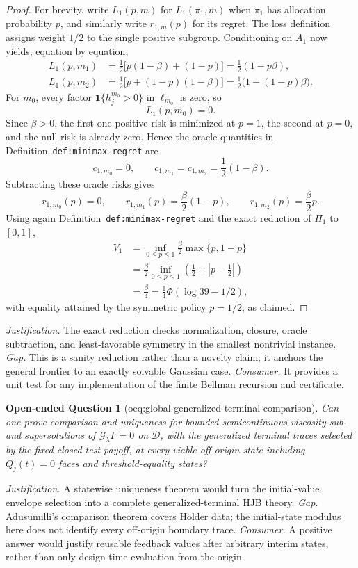 \documentclass{article}
\newtheorem{openendedquestion}{Open-ended Question}
\begin{document}
\begin{proof}
For brevity, write \(L_1(p,m)\) for \(L_1(\pi_1,m)\) when \(\pi_1\) has allocation probability \(p\), and similarly write \(r_{1,m}(p)\) for its regret.  The loss definition assigns weight \(1/2\) to the single positive subgroup.  Conditioning on \(A_1\) now yields, equation by equation,
\[
\begin{aligned}
 L_1(p,m_1)
 &=\frac12\bigl[p(1-\beta)+(1-p)\bigr]
 =\frac12(1-p\beta),\\
 L_1(p,m_2)
 &=\frac12\bigl[p+(1-p)(1-\beta)\bigr]
 =\frac12\bigl(1-(1-p)\beta\bigr).
\end{aligned}
\]
For \(m_0\), every factor \(\mathbf 1\{h_j^{m_0}>0\}\) in \(\ell_{m_0}\) is zero, so
\[
 L_1(p,m_0)=0.
\]
Since \(\beta>0\), the first one-positive risk is minimized at \(p=1\), the second at \(p=0\), and the null risk is already zero.  Hence the oracle quantities in Definition~\texttt{def:minimax-regret} are
\[
 c_{1,m_0}=0,
 \qquad
 c_{1,m_1}=c_{1,m_2}=\frac12(1-\beta).
\]
Subtracting these oracle risks gives
\[
 r_{1,m_0}(p)=0,
 \qquad
 r_{1,m_1}(p)=\frac{\beta}{2}(1-p),
 \qquad
 r_{1,m_2}(p)=\frac{\beta}{2}p.
\]
Using again Definition~\texttt{def:minimax-regret} and the exact reduction of \(\Pi_1\) to \([0,1]\),
\[
\begin{aligned}
 V_1
 &=\inf_{0\leq p\leq1}\frac{\beta}{2}\max\{p,1-p\}\\
 &=\frac{\beta}{2}\inf_{0\leq p\leq1}
 \left(\frac12+\left|p-\frac12\right|\right)\\
 &=\frac{\beta}{4}
 =\frac14\overline\Phi(\log 39-1/2),
\end{aligned}
\]
with equality attained by the symmetric policy \(p=1/2\), as claimed.
\end{proof}
\par\smallskip\noindent \textit{Justification.} The exact reduction checks normalization, closure, oracle subtraction, and least-favorable symmetry in the smallest nontrivial instance. \textit{Gap.} This is a sanity reduction rather than a novelty claim; it anchors the general frontier to an exactly solvable Gaussian case. \textit{Consumer.} It provides a unit test for any implementation of the finite Bellman recursion and certificate.

\begin{openendedquestion}[oeq:global-generalized-terminal-comparison]\label{oeq:global-generalized-terminal-comparison}
Can one prove comparison and uniqueness for bounded semicontinuous viscosity sub- and supersolutions of \(\mathcal G_\lambda F=0\) on \(\mathcal D\), with the generalized terminal traces selected by the fixed closed-test payoff, at every viable off-origin state including \(Q_j(t)=0\) faces and threshold-equality states?
\end{openendedquestion}
\par\smallskip\noindent \textit{Justification.} A statewise uniqueness theorem would turn the initial-value envelope selection into a complete generalized-terminal HJB theory. \textit{Gap.} Adusumilli's comparison theorem covers Hölder data; the initial-state modulus here does not identify every off-origin boundary trace. \textit{Consumer.} A positive answer would justify reusable feedback values after arbitrary interim states, rather than only design-time evaluation from the origin.
\end{document}
